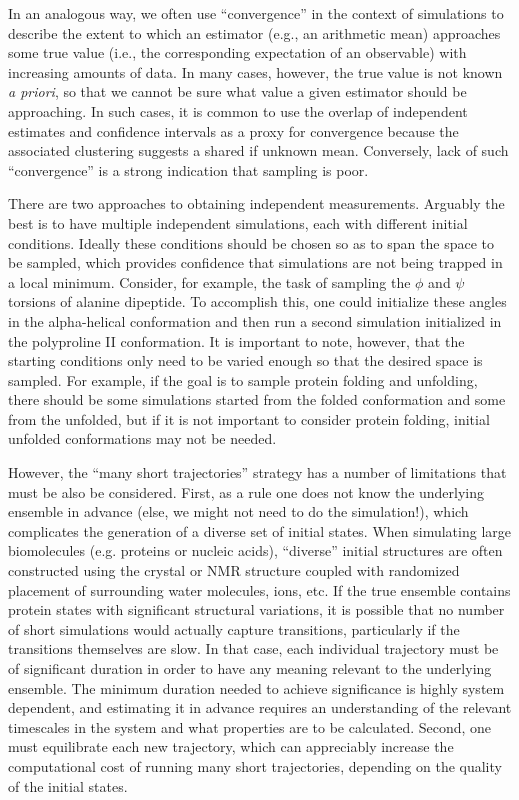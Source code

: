 In an analogous way, we often use ``convergence'' in the context of simulations to describe the extent to which an estimator (e.g., an arithmetic mean) approaches some true value (i.e., the corresponding expectation of an observable) with increasing amounts of data.  In many cases, however, the true value is not known {\it a priori}, so that we cannot be sure what value a given estimator should be approaching.  In such cases, it is common to use the overlap of independent estimates and confidence intervals as a proxy for convergence because the associated clustering suggests a shared if unknown mean.  Conversely, lack of such ``convergence'' is a strong indication that sampling is poor.


There are two approaches to obtaining independent measurements. Arguably the best is to have multiple independent simulations, each with different initial conditions. Ideally these conditions should be chosen so as to span the space to be sampled, which provides confidence that simulations are not being trapped in a local minimum. Consider, for example, the task of sampling the $\phi$ and $\psi$ torsions of alanine dipeptide.  To accomplish this, one could initialize these angles in the alpha-helical conformation and then run a second simulation initialized in the polyproline II conformation. It is important to note, however, that the starting conditions only need to be varied enough so that the desired space is sampled. For example, if the goal is to sample protein folding and unfolding, there should be some simulations started from the folded conformation and some from the unfolded, but if it is not important to consider protein folding, initial unfolded conformations may not be needed.

However, the ``many short trajectories'' strategy has a number of limitations that must be also be considered.  First, as a rule one does not know the underlying ensemble in advance (else, we might not need to do the simulation!), which complicates the generation of a diverse set of initial states. When simulating large biomolecules (e.g. proteins or nucleic acids), ``diverse'' initial structures are often constructed using the crystal or NMR structure coupled with randomized placement of surrounding water molecules, ions, etc.  If the true ensemble contains protein states with significant structural variations, it is possible that no number of short simulations would actually capture transitions, particularly if the transitions themselves are slow.  In that case, each individual trajectory must be of significant duration in order to have any meaning relevant to the underlying ensemble. The minimum duration needed to achieve significance is highly system dependent, and estimating it in advance requires an understanding of the relevant timescales in the system and what properties are to be calculated.  Second, one must equilibrate each new trajectory, which can appreciably increase the computational cost of running many short trajectories, depending on the quality of the initial states.

